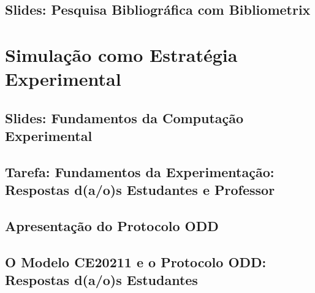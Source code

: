 \documentclass[12pt]{book}
\begin{document}
\chapter{Slides: Pesquisa Bibliográfica com Bibliometrix\label{bibliometrix}}
	


\part{Simulação como Estratégia Experimental\label{part:simulacao:estrategia}}

\chapter{Slides: Fundamentos da Computação Experimental\label{fundamentos:ce}}



\chapter{Tarefa: Fundamentos da Experimentação: Respostas d(a/o)s Estudantes e Professor}









%

%

\chapter{Apresentação do Protocolo ODD\label{oddprotocol}}
	
%

\chapter{O Modelo CE20211 e o Protocolo ODD: Respostas d(a/o)s Estudantes}
\end{document}

